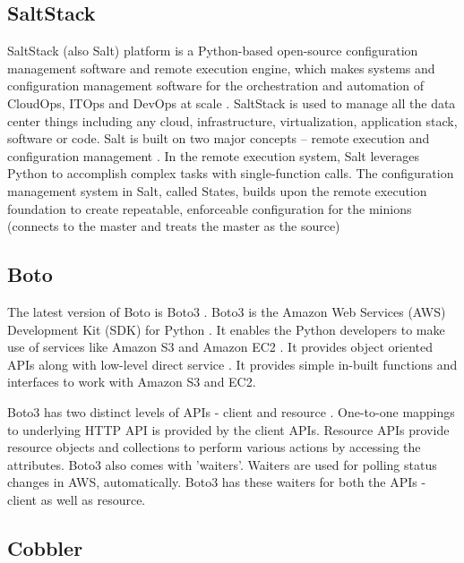 {\subsection{SaltStack}

     SaltStack (also Salt) platform is a Python-based open-source
     configuration management software and remote execution engine,
     which makes systems and configuration management software for the
     orchestration and automation of CloudOps, ITOps and DevOps at
     scale \cite{www-saltstack}. SaltStack is used to manage all the
     data center things including any cloud, infrastructure,
     virtualization, application stack, software or code. Salt is
     built on two major concepts -- remote execution and configuration
     management \cite{SaltStack-book}. In the remote execution system, Salt leverages Python
     to accomplish complex tasks with single-function calls. The
     configuration management system in Salt, called States, builds
     upon the remote execution foundation to create repeatable,
     enforceable configuration for the minions (connects to the master
     and treats the master as the source)

     \pv
     
\subsection{Boto}

     The latest version of Boto is Boto3 \cite{www-boto}.
     Boto3 is the Amazon Web Services (AWS) Development Kit (SDK) for
     Python \cite{www-boto-github}. It enables the
     Python developers to make use of services like Amazon S3
     and Amazon EC2 \cite{www-boto-amazon-python-sdk}.  It provides
     object oriented APIs along with low-level direct service 
     \cite{www-boto3-documentation}.  It provides simple in-built functions 
     and interfaces to work with Amazon S3 and EC2.

     Boto3 has two distinct levels of APIs - client and resource 
     \cite{www-boto-amazon-python-sdk}. One-to-one mappings to underlying 
     HTTP API is provided by the client APIs. Resource APIs provide resource
     objects and collections to perform various actions by accessing
     the attributes.  Boto3 also comes with 'waiters'. Waiters are
     used for polling status changes in AWS, automatically. Boto3 has
     these waiters for both the APIs
     - client as well as resource. 
     
\subsection{Cobbler}

}

